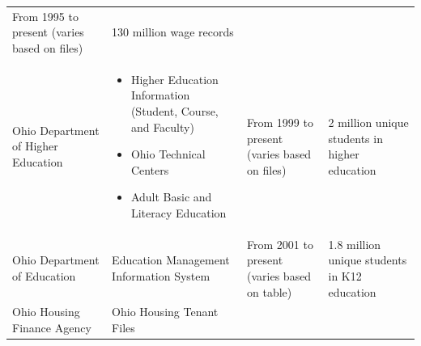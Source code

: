\documentclass[
]{WileySix}
\providecommand{\tightlist}{%
  \setlength{\itemsep}{0pt}\setlength{\parskip}{0pt}}
\begin{document}
\begin{longtable}[]{@{}llll@{}}
\begin{minipage}[t]{0.18\columnwidth}
From 1995 to
present
(varies
based on
files)\strut
\end{minipage} & \begin{minipage}[t]{0.18\columnwidth}\raggedright
130 million
wage records\strut
\end{minipage}\tabularnewline
\begin{minipage}[t]{0.19\columnwidth}\raggedright
Ohio
Department
of Higher
Education\strut
\end{minipage} & \begin{minipage}[t]{0.34\columnwidth}\raggedright
\begin{itemize}
\tightlist
\item
  Higher Education
  Information (Student,
  Course, and Faculty)
\item
  Ohio Technical Centers
\item
  Adult Basic and Literacy
  Education
\end{itemize}\strut
\end{minipage} & \begin{minipage}[t]{0.18\columnwidth}\raggedright
From 1999 to
present
(varies
based on
files)\strut
\end{minipage} & \begin{minipage}[t]{0.18\columnwidth}\raggedright
2 million
unique
students in
higher
education\strut
\end{minipage}\tabularnewline
\begin{minipage}[t]{0.19\columnwidth}\raggedright
Ohio
Department
of
Education\strut
\end{minipage} & \begin{minipage}[t]{0.34\columnwidth}\raggedright
Education Management
Information System\strut
\end{minipage} & \begin{minipage}[t]{0.18\columnwidth}\raggedright
From 2001 to
present
(varies
based on
table)\strut
\end{minipage} & \begin{minipage}[t]{0.18\columnwidth}\raggedright
1.8 million
unique
students in
K12
education\strut
\end{minipage}\tabularnewline
\begin{minipage}[t]{0.19\columnwidth}\raggedright
Ohio
Housing
Finance
Agency\strut
\end{minipage} & \begin{minipage}[t]{0.34\columnwidth}\raggedright
Ohio Housing Tenant Files\strut
\end{minipage} & \begin{minipage}[t]{0.18\columnwidth}\raggedright

\end{minipage}
\end{longtable}
\end{document}
